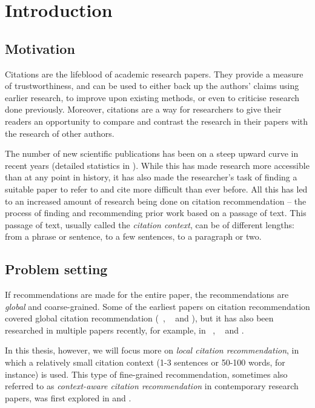 \chapter{Introduction}\label{chap:introduction}
\section{Motivation}
Citations are the lifeblood of academic research papers. They provide a measure of trustworthiness, and can be used to either back up the authors’ claims using earlier research, to improve upon existing methods, or even to criticise research done previously. Moreover, citations are a way for researchers to give their readers an opportunity to compare and contrast the research in their papers with the research of other authors. 

The number of new scientific publications has been on a steep upward curve in recent years (detailed statistics in \cite{stm2008}). While this has made research more accessible than at any point in history, it has also made the researcher's task of finding a suitable paper to refer to and cite more difficult than ever before. All this has led to an increased amount of research being done on citation recommendation -- the process of finding and recommending prior work based on a passage of text.
This passage of text, usually called the \textit{citation context}, can be of different lengths: from a phrase or sentence, to a few sentences, to a paragraph or two.

\section{Problem setting}
If recommendations are made for the entire paper, the recommendations are \textit{global} and coarse-grained. Some of the earliest papers on citation recommendation covered global citation recommendation (~\cite{McNeeACGLRKR02}, ~\cite{StrohmanCJ07} and \cite{NallapatiAXC08}), but it has also been researched in multiple papers recently, for example, in ~\cite{Bhagavatula2018}, ~\cite{YangZCDMGD18} and \cite{CaiHY18}.

In this thesis, however, we will focus more on \textit{local citation recommendation}, in which a relatively small citation context (1-3 sentences or 50-100 words, for instance) is used. This type of fine-grained recommendation, sometimes also referred to as \textit{context-aware citation recommendation} in contemporary research papers, was first explored in \cite{He2010} and \cite{He2011}. 

